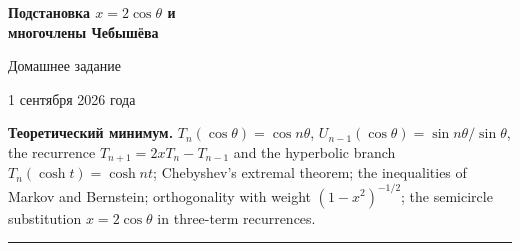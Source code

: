 \documentclass[11pt,a4paper]{article}
\begin{document}
\begin{center}
{\huge\bfseries\foreignlanguage{russian}{Подстановка $x=2\cos\theta$ и\\ многочлены Чебышёва}\par}\vspace{1.2em}
{\Large\foreignlanguage{russian}{Домашнее задание}\par}\vspace{0.8em}
{\foreignlanguage{russian}{1 сентября 2026 года}\par}
\end{center}\vspace{0.5em}

\noindent\textbf{\foreignlanguage{russian}{Теоретический минимум.}}\quad
$T_n(\cos\theta)=\cos n\theta$, $U_{n-1}(\cos\theta)=\sin n\theta/\sin\theta$, the recurrence
$T_{n+1}=2xT_n-T_{n-1}$ and the hyperbolic branch $T_n(\cosh t)=\cosh nt$; Chebyshev's extremal
theorem; the inequalities of Markov and Bernstein; orthogonality with weight $(1-x^2)^{-1/2}$; the
semicircle substitution $x=2\cos\theta$ in three-term recurrences.

\medskip
\noindent\rule{\textwidth}{0.4pt}
\medskip
\end{document}

